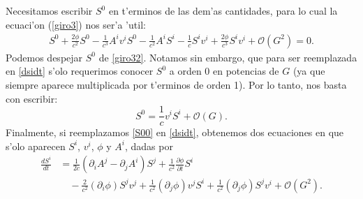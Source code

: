 Necesitamos escribir $S^0$ en t'erminos de las dem'as cantidades, para lo cual la ecuaci'on (\ref{giro3}) nos ser'a 'util:
\begin{align}
S^0+\frac{2\phi}{c^2}S^0-\frac{1}{c^3}A^iv^iS^0-\frac{1}{c^2}A^iS^i-\frac{1}{c}S^iv^i 
+\frac{2\phi}{c^3}S^iv^i+\mathcal{O}(G^2)=0.\label{giro32}
\end{align}
Podemos despejar $S^0$ de \eqref{giro32}. Notamos sin embargo, que para ser reemplazada en \eqref{dsidt} s'olo requerimos conocer $S^0$ a orden 0 en potencias de $G$ (ya que siempre aparece multiplicada por t'erminos de orden 1). Por lo tanto, nos basta con escribir:
\begin{equation}
S^0=\frac{1}{c}v^iS^i +\mathcal{O}(G).\label{S00}
\end{equation}
Finalmente, si reemplazamos \eqref{S00} %
en \eqref{dsidt}, %
obtenemos dos ecuaciones en que s'olo aparecen $S^i$, $v^i$, $\phi$ y $A^i$, dadas por
\begin{align}
\frac{dS^{i}}{dt} &= \frac{1}{2c}\left(\partial_iA^j-\partial_jA^i\right)S^j+\frac{1}{c^2}\frac{\partial \phi}{\partial t}S^i \nonumber \\
&\quad  -\frac{2}{c^2}(\partial_i\phi) S^jv^j+\frac{1}{c^2}(\partial_j\phi)v^jS^i+\frac{1}{c^2}(\partial_j\phi)S^jv^i+\mathcal{O}(G^2).\label{dsidt2}
\end{align}
